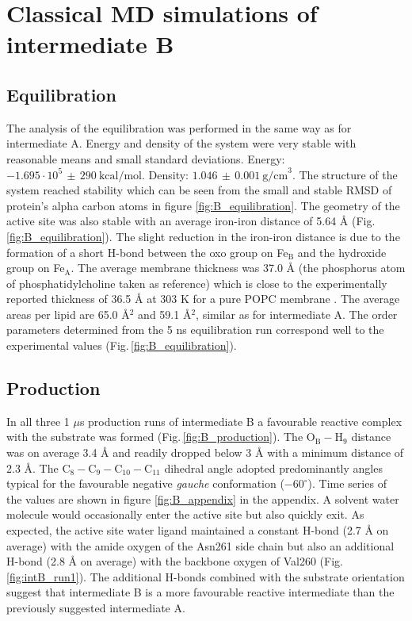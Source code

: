 \section{Classical MD simulations of intermediate B}
\subsection{Equilibration}
The analysis of the equilibration was performed in the same way as for intermediate A. Energy and density of the system were very stable with reasonable means and small standard deviations. Energy: $-1.695 \cdot 10^5 \, \pm \, 290 ~ \text{kcal/mol}$. Density: $1.046 \, \pm \, 0.001 ~ \text{g/cm}^3$. The structure of the system reached stability which can be seen from the small and stable RMSD of protein's alpha carbon atoms in figure \ref{fig:B_equilibration}. The geometry of the active site was also stable with an average iron-iron distance of 5.64 Å (Fig. \ref{fig:B_equilibration}). The slight reduction in the iron-iron distance is due to the formation of a short H-bond between the oxo group on Fe$_{\text{B}}$ and the hydroxide group on Fe$_{\text{A}}$. The average membrane thickness was 37.0 Å (the phosphorus atom of phosphatidylcholine taken as reference) which is close to the experimentally reported thickness of 36.5 Å at 303 K for a pure POPC membrane \cite{kucerka2011}. The average areas per lipid are 65.0 Å$^2$ and 59.1 Å$^2$, similar as for intermediate A. The order parameters determined from the 5 ns equilibration run correspond well to the experimental values (Fig.\,\ref{fig:B_equilibration}).

\subsection{Production}
In all three 1 $\mu$s production runs of intermediate B a favourable reactive complex with the substrate was formed (Fig.\,\ref{fig:B_production}). The O$_{\text{B}}-$H$_9$ distance was on average 3.4 Å and readily dropped below 3 Å with a minimum distance of 2.3 Å. The C$_8-$C$_9-$C$_{10}-$C$_{11}$ dihedral angle adopted predominantly angles typical for the favourable negative \textit{gauche} conformation ($-60^{\circ}$). Time series of the values are shown in figure \ref{fig:B_appendix} in the appendix. A solvent water molecule would occasionally enter the active site but also quickly exit. As expected, the active site water ligand maintained a constant H-bond (2.7 Å on average) with the amide oxygen of the Asn261 side chain but also an additional H-bond (2.8 Å on average) with the backbone oxygen of Val260 (Fig.\,\ref{fig:intB_run1}). The additional H-bonds combined with the substrate orientation suggest that intermediate B is a more favourable reactive intermediate than the previously suggested intermediate A.

